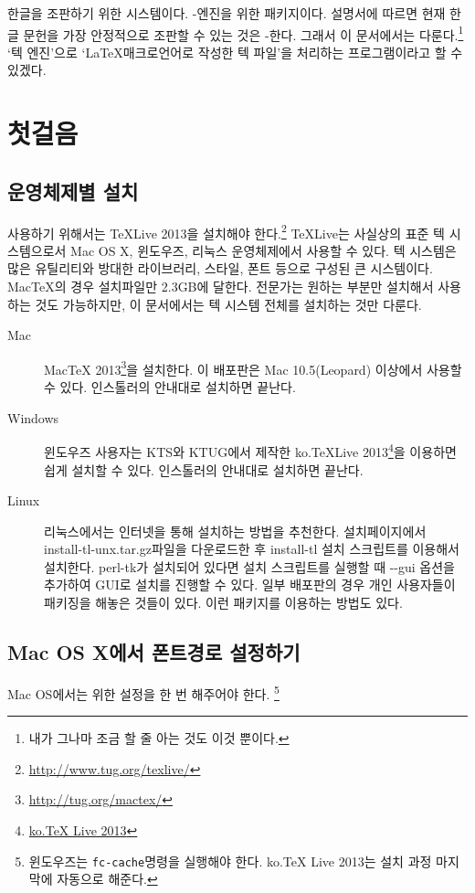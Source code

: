 \documentclass[oneside, chapter, 11pt]{oblivoir}
\begin{document}
  한글을 조판하기 위한 시스템이다. \XeTeX- \XeTeX 엔진을 위한 \koTeX 패키지이다.  설명서에 따르면 현재 한글 문헌을 가장 안정적으로 조판할 수 있는 것은 \XeTeX- 한다. 그래서 이 문서에서는  다룬다.\footnote{내가 그나마 조금 할 줄 아는 것도 이것 뿐이다.}  ` 텍 엔진'으로 `\LaTeX 매크로언어로 작성한 텍 파일'을 처리하는 프로그램이라고 할 수 있겠다.

\mainmatter
\chapter{첫걸음}
\section{운영체제별 설치}
 사용하기 위해서는 TeXLive 2013을 설치해야 한다.\footnote{\href{http://www.tug.org/texlive/}{http://www.tug.org/texlive/}} TeXLive는 사실상의 표준 텍 시스템으로서 Mac OS X, 윈도우즈, 리눅스 운영체제에서 사용할 수 있다. 텍 시스템은 많은 유틸리티와 방대한 라이브러리, 스타일, 폰트 등으로 구성된 큰 시스템이다. MacTeX의 경우 설치파일만 2.3GB에 달한다. 전문가는 원하는 부분만 설치해서 사용하는 것도 가능하지만, 이 문서에서는 텍 시스템 전체를 설치하는 것만 다룬다.

\begin{description}
\item[Mac] MacTeX 2013\footnote{\href{http://tug.org/mactex/}{http://tug.org/mactex/}}을 설치한다. 이 배포판은 Mac 10.5(Leopard) 이상에서 사용할 수 있다. 인스톨러의 안내대로 설치하면 끝난다.
\item[Windows] 윈도우즈 사용자는 KTS와 KTUG에서 제작한 ko.TeXLive 2013\footnote{\href{http://www.ktug.org/xe/index.php?mid=KTUG_open_board&document_srl=175806}{ko.TeX Live 2013}}을 이용하면 쉽게 설치할 수 있다. 인스톨러의 안내대로 설치하면 끝난다.
\item[Linux] 리눅스에서는 인터넷을 통해 설치하는 방법을 추천한다. 설치페이지에서 install-tl-unx.tar.gz파일을 다운로드한 후 install-tl 설치 스크립트를 이용해서 설치한다. perl-tk가 설치되어 있다면 설치 스크립트를 실행할 때 -{}-gui 옵션을 추가하여 GUI로 설치를 진행할 수 있다. 일부 배포판의 경우 개인 사용자들이 패키징을 해놓은 것들이 있다. 이런 패키지를 이용하는 방법도 있다.
\end{description}

\section{Mac OS X에서 폰트경로 설정하기}
Mac OS에서는  위한 설정을 한 번 해주어야 한다. \footnote{윈도우즈는 \texttt{fc-cache}명령을 실행해야 한다. ko.TeX Live 2013는 설치 과정 마지막에 자동으로 해준다.}
\end{document}
